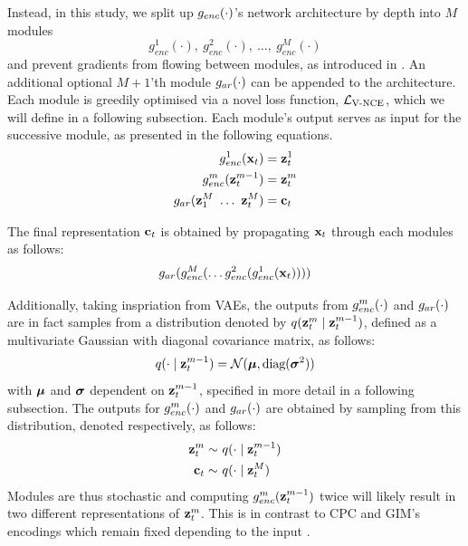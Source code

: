 			Instead, in this study, we split up $g_{enc}(\cdot)$'s network architecture by depth into $M$ modules 
			$$g_{enc}^1(\cdot),~ g_{enc}^2(\cdot),~\dots,~g_{enc}^M(\cdot)$$ 
			and prevent gradients from flowing between modules, as introduced in \cite{lowePuttingEndEndtoEnd2020}. An additional optional $M+1$'th module $g_{ar}(\cdot)$ can be appended to the architecture. Each module is greedily optimised via a novel loss function, $\mathcal{L}_{\text{V-NCE}}$, which we will define in a following subsection. Each module's output serves as input for the successive module, as presented in the following equations. %
			\begin{align*} %
				g_{enc}^1(\xt) &= \zt^1 \\
				g_{enc}^m(\zt^{m-1}) &= \zt^m \\
				g_{ar}(\z_1^M ~ \dots ~ \zt^M) &= \ct
			\end{align*}
			
			The final representation $\mathbf{c}_t$ is obtained by propagating $\mathbf{x}_t$ through each modules as follows:
			$$ g_{ar}(g_{enc}^M ( \dots	g_{enc}^2(g_{enc}^1(\mathbf{x}_t)))) $$
			
			
			
					
			Additionally, taking inspriation from VAEs, the outputs from $g_{enc}^m(\cdot)$ and $g_{ar}(\cdot)$ are in fact samples from a distribution denoted by $q(\mathbf{z}_t^m \mid \mathbf{z}_t^{m-1})$, defined as a multivariate Gaussian with diagonal covariance matrix, as follows:
			$$q(\cdot \mid \mathbf{z}_t^{m-1}) = \mathcal{N}(\bm{\mu}, \text{diag}(\bm{\sigma}^2))$$
			with $\bm{\mu}$ and $\bm{\sigma}$ dependent on $\mathbf{z}_t^{m-1}$, specified in more detail in a following subsection.
			The outputs for $g_{enc}^m(\cdot)$ and $g_{ar}(\cdot)$ are obtained by sampling from this distribution, denoted respectively, as follows:
 			\begin{align} %
			 	\sample{\zt^m}~ & \qfromzmneg  \label{eq:sample_z_from_q} \\
			 	\sample{\ct}~ & \qfromzM
			 \end{align}
			Modules are thus stochastic and computing $g_{enc}^m(\mathbf{z}_t^{m-1})$ twice will likely result in two different representations of $\mathbf{z}_t^m$. This is in contrast to CPC and GIM's encodings which remain fixed depending to the input \cite{oordRepresentationLearningContrastive2019, lowePuttingEndEndtoEnd2020}.
		
